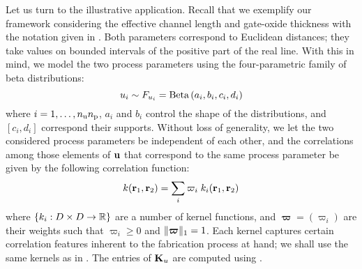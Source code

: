 Let us turn to the illustrative application.
Recall that we exemplify our framework considering the effective channel length and gate-oxide thickness with the notation given in .
Both parameters correspond to Euclidean distances; they take values on bounded intervals of the positive part of the real line.
With this in mind, we model the two process parameters using the four-parametric family of beta distributions:
\begin{equation*}
  \u_i \sim \distribution_{\u_i} = \betaDistribution{a_i, b_i, c_i, d_i}
\end{equation*}
where $i = 1, \dots, \nparams \nprocs$, $a_i$ and $b_i$ control the shape of the distributions, and $[ c_i, d_i ]$ correspond their supports.
Without loss of generality, we let the two considered process parameters be independent of each other, and the correlations among those elements of $\vu$ that correspond to the same process parameter be given by the following correlation function:
\begin{equation} \elab{correlation-function}
  \fCorr(\vr_1, \vr_2) = \sum_i \varpi_i \; \fCorr_i(\vr_1, \vr_2)
\end{equation}
where $\{ \fCorr_i: \domain \times \domain \to \real \}$ are a number of kernel functions, and $\bm{\varpi} = (\varpi_i)$ are their weights such that $\varpi_i \geq 0$ and $\norm[1]{\bm{\varpi}} = 1$.
Each kernel captures certain correlation features inherent to the fabrication process at hand; we shall use the same kernels as in \cite{ukhov2014}.
The entries of $\mCorr_\u$ are computed using .
